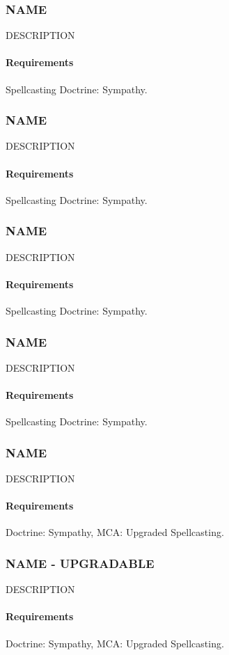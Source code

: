 \subsubsection{NAME} \label{feat::name}
    DESCRIPTION
    \paragraph{Requirements} Spellcasting Doctrine: Sympathy.
\subsubsection{NAME} \label{feat::name}
    DESCRIPTION
    \paragraph{Requirements} Spellcasting Doctrine: Sympathy.
\subsubsection{NAME} \label{feat::name}
    DESCRIPTION
    \paragraph{Requirements} Spellcasting Doctrine: Sympathy.
\subsubsection{NAME} \label{feat::name}
    DESCRIPTION
    \paragraph{Requirements} Spellcasting Doctrine: Sympathy.

\subsubsection{NAME} \label{feat::name}
    DESCRIPTION
    \paragraph{Requirements} Doctrine: Sympathy, MCA: Upgraded Spellcasting.
\subsubsection{NAME - UPGRADABLE} \label{feat::name}
    DESCRIPTION
    \paragraph{Requirements} Doctrine: Sympathy, MCA: Upgraded Spellcasting.
